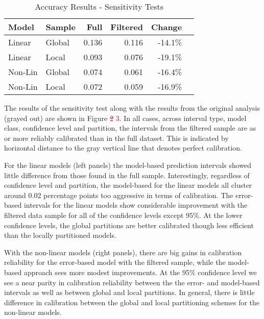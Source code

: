\documentclass[colTwo]{anon}
\theoremstyle{definition}
\begin{document}
\begin{table}[h]
\centering
\begin{tabular}{l|l|r|r|r|r}
\hline
\textbf{Model} & \textbf{Sample} & \textbf{Full} & \textbf{Filtered} & \textbf{Change}\\
\hline
Linear & Global & 0.136 & 0.116 & -14.1\% \\
Linear & Local & 0.093 & 0.076 & -19.1\% \\
\hline
Non-Lin & Global & 0.074 & 0.061 & -16.4\% \\
Non-Lin & Local & 0.072 & 0.059 & -16.9\% \\
\hline
\end{tabular}
\caption{Accuracy Results - Sensitivity Tests}
\label{table:7}
\end{table}

The results of the sensitivity test along with the results from the original analysis (grayed out) are shown in Figure \textcolor{red}{\st{2} 3}.  In all cases, across interval type, model class, confidence level and partition, the intervals from the filtered sample are as or more reliably calibrated than in the full dataset. This is indicated by horizontal distance to the gray vertical line that denotes perfect calibration.  

For the linear models (left panels) the model-based prediction intervals showed little difference from those found in the full sample.  Interestingly, regardless of confidence level and partition, the model-based for the linear models all cluster around 0.02 percentage points too aggressive in terms of calibration.  The error-based intervals for the linear models show considerable improvement with the filtered data sample for all of the confidence levels except 95\%. At the lower confidence levels, the global partitions are better calibrated though less efficient than the locally partitioned models.

With the non-linear models (right panels), there are big gains in calibration reliability for the error-based model with the filtered sample, while the model-based approach sees more modest improvements.  At the 95\% confidence level we see a near parity in calibration reliability between the the error- and model-based intervals as well as between global and local partitions.  In general, there is little difference in calibration between the global and local partitioning schemes for the non-linear models.  
\end{document}
